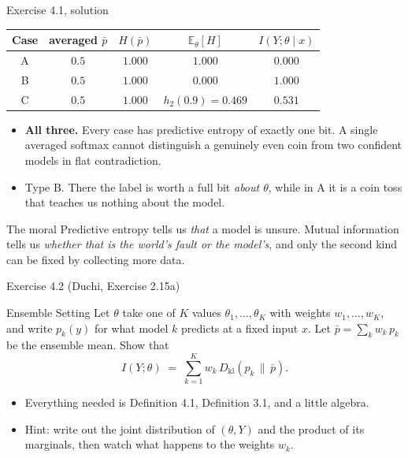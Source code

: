 \documentclass[aspectratio=169,9pt]{beamer}
\newcommand{\orange}[1]{\textcolor{AmazonOrange}{\textbf{#1}}}
\newcommand{\muted}[1]{\textcolor{EPICMuted}{#1}}
\newcommand{\KL}[2]{D_{\mathrm{kl}}\!\left(#1 \,\|\, #2\right)}
\newcommand{\E}{\mathbb{E}}
\begin{document}
\begin{frame}{Exercise 4.1, solution}
\begin{center}
\footnotesize
\begin{tabular}{ccccc}
\toprule
\textbf{Case} & averaged $\bar p$ & $H(\bar p)$ & $\E_\theta[H]$ & $I(Y;\theta \mid x)$ \\
\midrule
A & $0.5$ & $1.000$ & $1.000$ & $\mathbf{0.000}$ \\
B & $0.5$ & $1.000$ & $0.000$ & $\mathbf{1.000}$ \\
C & $0.5$ & $1.000$ & $h_2(0.9) = 0.469$ & $\mathbf{0.531}$ \\
\bottomrule
\end{tabular}
\end{center}
\pause
\vspace{0.15cm}
\begin{itemize}
    \item[(2)] \orange{All three.} Every case has predictive entropy of exactly one bit. A single averaged
    softmax cannot distinguish a genuinely even coin from two confident models in flat contradiction.
    \pause
    \item[(3)] Type B. There the label is worth a full bit \textit{about $\theta$}, while in A it is a coin
    toss that teaches us nothing about the model.
\end{itemize}
\vspace{0.15cm}
\pause
\begin{alertblock}{The moral}
Predictive entropy tells us \textit{that} a model is unsure. Mutual information tells us \textit{whether that
is the world's fault or the model's}, and only the second kind can be fixed by collecting more data.
\end{alertblock}
\end{frame}

\begin{frame}{Exercise 4.2 \muted{(Duchi, Exercise 2.15a)}}
\begin{exampleblock}{Ensemble Setting}
Let $\theta$ take one of $K$ values $\theta_1, \dots, \theta_K$ with weights $w_1, \dots, w_K$, and write
$p_k(y)$ for what model $k$ predicts at a fixed input $x$. Let $\bar p = \sum_k w_k\, p_k$ be the ensemble
mean. Show that
\vspace{-0.1cm}
\[
    I(Y;\theta) \;=\; \sum_{k=1}^K w_k \, \KL{p_k}{\bar p} .
\]
\end{exampleblock}
\pause
\vspace{0.15cm}
\begin{itemize}
    \item Everything needed is Definition 4.1, Definition 3.1, and a little algebra.
    \pause
    \item \muted{Hint: write out the joint distribution of $(\theta, Y)$ and the product of its marginals,
    then watch what happens to the weights $w_k$.}
\end{itemize}
\end{frame}
\end{document}
